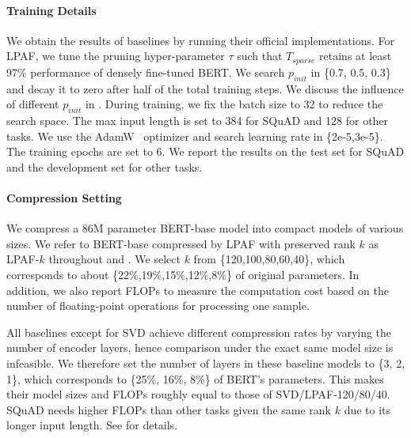 \paragraph{Training Details}
We obtain the results of baselines by running their official implementations. For LPAF, we tune the pruning hyper-parameter $\tau$ such that $T_{sparse}$ retains at least 97\% performance of densely fine-tuned BERT. We search $p_{init}$ in \{0.7, 0.5, 0.3\} and decay it to zero after half of the total training steps. We discuss the influence of different $p_{init}$ in . During training, we
fix the batch size to 32 to reduce the search space. The max input length is set to 384 for SQuAD and 128 for other tasks. We use the AdamW~\cite{adamw} optimizer and search learning rate in \{2e-5,3e-5\}. The training epochs are set to 6. We report the results on the test set for SQuAD and the development set for other tasks. 

\paragraph{Compression Setting}

We compress a 86M parameter BERT-base model  into compact models of various sizes. 
We refer to BERT-base compressed by  LPAF with preserved rank $k$ as LPAF-$k$ throughout  and . We select $k$ from \{120,100,80,60,40\}, which corresponds to about \{22\%,19\%,15\%,12\%,8\%\} of original parameters. In addition, we also report FLOPs to measure the computation cost based on the number of floating-point operations for processing one sample.

 All baselines except for SVD achieve different compression rates by varying the number 
of encoder layers, hence comparison under the exact same model size is infeasible. 
We therefore set the number of layers in these baseline models to \{3, 2, 1\}, 
which corresponds to \{25\%, 16\%, 8\%\} of BERT's parameters. 
This makes their model sizes and FLOPs roughly equal to those of SVD/LPAF-120/80/40. 
SQuAD needs higher FLOPs than other tasks given the same  rank $k$ due to its longer input  length. See  for details.

